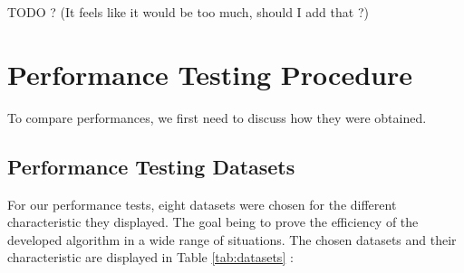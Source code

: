 \documentclass{eplmastersthesis}
\begin{document}
TODO ? (It feels like it would be too much, should I add that ?)

\section{Performance Testing Procedure}

To compare performances, we first need to discuss how they were obtained.

\subsection{Performance Testing Datasets}

For our performance tests, eight datasets were chosen for the different characteristic they displayed. The goal being to prove the efficiency of the developed algorithm in a wide range of situations. The chosen datasets and their characteristic are displayed in Table \ref{tab:datasets} : \newline
\end{document}

